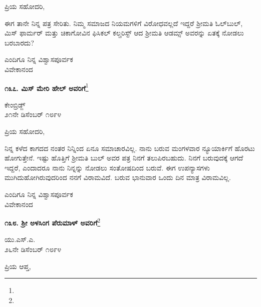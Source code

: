 \noindent
ಪ್ರಿಯ ಸಹೋದರಿ,

ಈಗ ತಾನೇ ನಿನ್ನ ಪತ್ರ ಸೇರಿತು. ನಿಮ್ಮ ಸಮಾಜದ ನಿಯಮಗಳಿಗೆ ವಿರೋಧವಲ್ಲದೆ ಇದ್ದರೆ ಶ‍್ರೀಮತಿ ಓಲ್‌ಬುಲ್, ಮಿಸ್ ಫಾರ್ಮರ್ ಮತ್ತು ಚಿಕಾಗೋವಿನ ಫಿಸಿಕಲ್ ಕಲ್ಚರಿಸ್ಟ್ ಆದ ಶ‍್ರೀಮತಿ ಆಡಮ್ಸ್ ಅವರನ್ನು ಏತಕ್ಕೆ ನೋಡಲು ಬರಬಾರದು?

\vspace{-0.4cm}

{\flushright
ಎಂದಿಗೂ ನಿನ್ನ ವಿಶ್ವಾಸಪೂರ್ವಕ\\ವಿವೇಕಾನಂದ\par}

\begin{center}
\textbf{೧೩೭. ಮಿಸ್ ಮೇರಿ ಹೇಲ್ ಅವರಿಗೆ}\footnote{}
\end{center}

\vspace{-0.7cm}

\begin{flushright}
ಕೇಂಬ್ರಿಡ್ಜ್\\೨೧ನೇ ಡಿಸೆಂಬರ್ ೧೮೯೪
\end{flushright}

\vspace{-0.6cm}

\noindent
ಪ್ರಿಯ ಸಹೋದರಿ,

ನಿನ್ನ ಕಳೆದ ಕಾಗದದ ನಂತರ ನಿನ್ನಿಂದ ಏನೂ ಸಮಾಚಾರವಿಲ್ಲ. ನಾನು ಬರುವ ಮಂಗಳವಾರ ನ್ಯೂಯಾರ್ಕಿಗೆ ಹೊರಟು ಹೋಗುತ್ತೇನೆ. ಇಷ್ಟು ಹೊತ್ತಿಗೆ ಶ‍್ರೀಮತಿ ಬುಲ್ ಅವರ ಪತ್ರ ನಿನಗೆ ತಲುಪಿರಬಹುದು. ನಿನಗೆ ಬರುವುದಕ್ಕೆ ಆಗದೆ ಇದ್ದರೆ, ಎಂದಾದರೂ ನಾನು ನಿನ್ನನ್ನು ನೋಡಲು ಸಂತೋಷದಿಂದ ಬರುವೆ. ಈಗ ಉಪನ್ಯಾಸಗಳು ಮುಗಿದುಹೋಗಿರುವುದರಿಂದ ನನಗೆ ವಿರಾಮವಿದೆ. ಬರುವ ಭಾನುವಾರ ಒಂದು ದಿನ ಮಾತ್ರ ವಿರಾಮವಿಲ್ಲ.

\vspace{-0.6cm}

{\flushright
ಎಂದಿಗೂ ನಿನ್ನ ವಿಶ್ವಾಸಪೂರ್ವಕ\\ವಿವೇಕಾನಂದ\par}

\begin{center}
\textbf{೧೩೮. ಶ‍್ರೀ ಅಳಸಿಂಗ ಪೆರುಮಾಳ್ ಅವರಿಗೆ}\footnote{}
\end{center}

\vspace{-0.7cm}

\begin{flushright}
ಯು.ಎಸ್.ಎ.\\೨೬ನೇ ಡಿಸೆಂಬರ್ ೧೮೯೪
\end{flushright}

\vspace{-0.6cm}

\noindent
ಪ್ರಿಯ ಆಪ್ತ,

